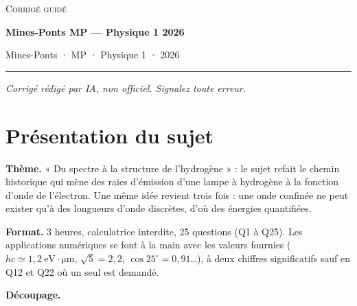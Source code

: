 \documentclass[11pt,a4paper]{article}
\begin{document}
\thispagestyle{plain}
\begin{center}
  {\small\scshape Corrigé guidé}\par\smallskip
  {\LARGE\bfseries Mines-Ponts MP — Physique 1 2026\par}\medskip
  {\large Mines-Ponts · MP · Physique 1 · 2026\par}
\end{center}
\vspace{2pt}\hrule\vspace{8pt}

\emph{Corrigé rédigé par IA, non officiel. Signalez toute erreur.}

\hypertarget{pruxe9sentation-du-sujet}{%
\section{Présentation du sujet}\label{pruxe9sentation-du-sujet}}

\textbf{Thème.} « Du spectre à la structure de l'hydrogène » : le sujet refait le chemin historique qui mène des raies d'émission d'une lampe à hydrogène à la fonction d'onde de l'électron. Une même idée revient trois fois : une onde confinée ne peut exister qu'à des longueurs d'onde discrètes, d'où des énergies quantifiées.

\textbf{Format.} 3 heures, calculatrice interdite, 25 questions (Q1 à Q25). Les applications numériques se font à la main avec les valeurs fournies (\(hc\simeq1{,}2\ \mathrm{eV\cdot\mu m}\), \(\sqrt5=2{,}2\), \(\cos25^\circ=0{,}91\)\ldots), à deux chiffres significatifs sauf en Q12 et Q22 où un seul est demandé.

\textbf{Découpage.}
\end{document}
